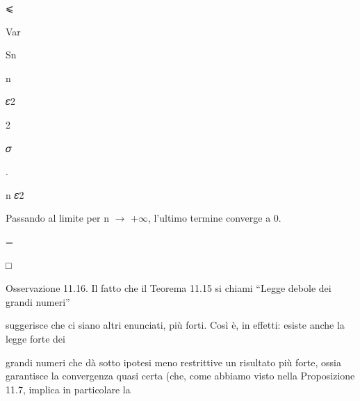 \documentclass[a4paper,portrait,12pt]{article}
\begin{document}
⩽





\begin{flushleft}
Var
\end{flushleft}





\begin{flushleft}
Sn
\end{flushleft}


\begin{flushleft}
n
\end{flushleft}





\begin{flushleft}
𝜀2
\end{flushleft}


2





\begin{flushleft}
𝜎
\end{flushleft}


.


\begin{flushleft}
n 𝜀2
\end{flushleft}


\begin{flushleft}
Passando al limite per n $\rightarrow$ +$\infty$, l'ultimo termine converge a 0.
\end{flushleft}


=





□





\begin{flushleft}
Osservazione 11.16. Il fatto che il Teorema 11.15 si chiami {``}Legge debole dei grandi numeri''
\end{flushleft}


\begin{flushleft}
suggerisce che ci siano altri enunciati, più forti. Così \`{e}, in effetti: esiste anche la legge forte dei
\end{flushleft}


\begin{flushleft}
grandi numeri che d\`{a} sotto ipotesi meno restrittive un risultato più forte, ossia garantisce la convergenza quasi certa (che, come abbiamo visto nella Proposizione 11.7, implica in particolare la
\end{flushleft}
\end{document}
